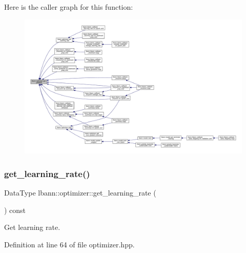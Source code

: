 Here is the caller graph for this function\+:\nopagebreak
\begin{figure}[H]
\begin{center}
\leavevmode
\includegraphics[width=350pt]{classlbann_1_1optimizer_a12b7dbc72eb2de78d6ad798b8939f349_icgraph}
\end{center}
\end{figure}
\mbox{\label{classlbann_1_1optimizer_ac52867427b0d28ec6888b6344104791d}} 
\subsubsection{\texorpdfstring{get\+\_\+learning\+\_\+rate()}{get\_learning\_rate()}}
{\footnotesize\ttfamily Data\+Type lbann\+::optimizer\+::get\+\_\+learning\+\_\+rate (\begin{DoxyParamCaption}{ }\end{DoxyParamCaption}) const\hspace{0.3cm}{\ttfamily [inline]}}

Get learning rate. 

Definition at line 64 of file optimizer.\+hpp.


